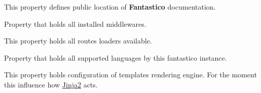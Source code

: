 \documentclass[letterpaper,10pt,english]{sphinxmanual}
\begin{document}
\begin{fulllineitems}
\begin{fulllineitems}
\end{fulllineitems}


\begin{fulllineitems}
\label{get_started/settings:fantastico.settings.BasicSettings.doc_base}
This property defines public location of \textbf{Fantastico} documentation.

\end{fulllineitems}


\begin{fulllineitems}
\label{get_started/settings:fantastico.settings.BasicSettings.installed_middleware}
Property that holds all installed middlewares.

\end{fulllineitems}


\begin{fulllineitems}
\label{get_started/settings:fantastico.settings.BasicSettings.routes_loaders}
This property holds all routes loaders available.

\end{fulllineitems}


\begin{fulllineitems}
\label{get_started/settings:fantastico.settings.BasicSettings.supported_languages}
Property that holds all supported languages by this fantastico instance.

\end{fulllineitems}


\begin{fulllineitems}
\label{get_started/settings:fantastico.settings.BasicSettings.templates_config}
This property holds configuration of templates rendering engine. For the moment this influence how
\href{http://jinja.pocoo.org/docs/}{Jinja2} acts.

\end{fulllineitems}


\end{fulllineitems}
\end{document}
